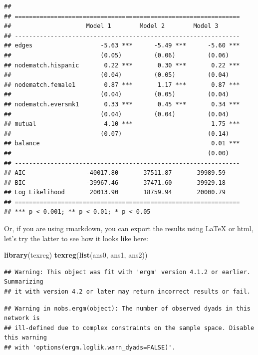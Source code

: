 \documentclass[
]{book}
\newenvironment{Shaded}{\begin{snugshade}}{\end{snugshade}}
\newcommand{\FunctionTok}[1]{\textcolor[rgb]{0.13,0.29,0.53}{\textbf{#1}}}
\newcommand{\NormalTok}[1]{#1}
\begin{document}
\begin{verbatim}
## 
## ===============================================================
##                     Model 1        Model 2        Model 3      
## ---------------------------------------------------------------
## edges                   -5.63 ***      -5.49 ***      -5.60 ***
##                         (0.05)         (0.06)         (0.06)   
## nodematch.hispanic       0.22 ***       0.30 ***       0.22 ***
##                         (0.04)         (0.05)         (0.04)   
## nodematch.female1        0.87 ***       1.17 ***       0.87 ***
##                         (0.04)         (0.05)         (0.04)   
## nodematch.eversmk1       0.33 ***       0.45 ***       0.34 ***
##                         (0.04)         (0.04)         (0.04)   
## mutual                   4.10 ***                      1.75 ***
##                         (0.07)                        (0.14)   
## balance                                                0.01 ***
##                                                       (0.00)   
## ---------------------------------------------------------------
## AIC                 -40017.80      -37511.87      -39989.59    
## BIC                 -39967.46      -37471.60      -39929.18    
## Log Likelihood       20013.90       18759.94       20000.79    
## ===============================================================
## *** p < 0.001; ** p < 0.01; * p < 0.05
\end{verbatim}

Or, if you are using rmarkdown, you can export the results using LaTeX or html, let's try the latter to see how it looks like here:

\begin{Shaded}
\begin{Highlighting}[]
\FunctionTok{library}\NormalTok{(texreg)}
\FunctionTok{texreg}\NormalTok{(}\FunctionTok{list}\NormalTok{(ans0, ans1, ans2))}
\end{Highlighting}
\end{Shaded}

\begin{verbatim}
## Warning: This object was fit with 'ergm' version 4.1.2 or earlier. Summarizing
## it with version 4.2 or later may return incorrect results or fail.
\end{verbatim}

\begin{verbatim}
## Warning in nobs.ergm(object): The number of observed dyads in this network is
## ill-defined due to complex constraints on the sample space. Disable this warning
## with 'options(ergm.loglik.warn_dyads=FALSE)'.
\end{verbatim}
\end{document}
